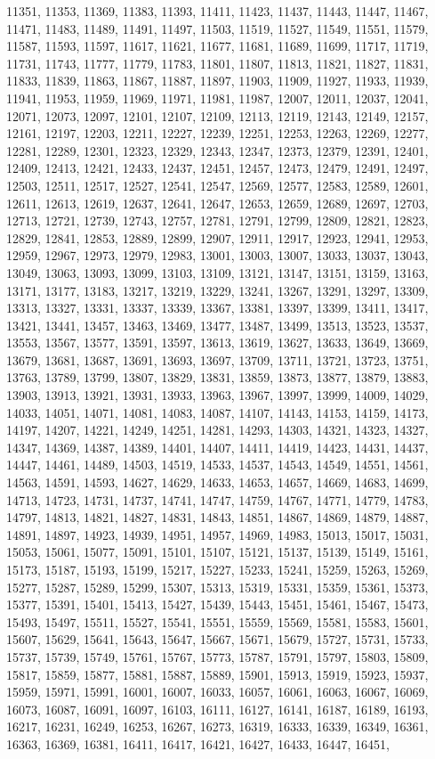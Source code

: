 \documentclass[10pt,twocolumn]{article}
\begin{document}
\begin{thebibliography}{9}
11351, 11353, 11369, 11383, 11393, 11411, 11423, 11437, 11443, 11447, 11467, 11471, 11483, 11489, 11491, 11497, 11503, 11519, 11527, 11549, 11551, 11579, 11587, 11593, 11597, 11617, 11621, 11677, 11681, 11689, 11699, 11717, 11719, 11731, 11743, 11777, 11779, 11783, 11801, 11807, 11813, 11821, 11827, 11831, 11833, 11839, 11863, 11867, 11887, 11897, 11903, 11909, 11927, 11933, 11939, 11941, 11953, 11959, 11969, 11971, 11981, 11987, 12007, 12011, 12037, 12041, 12071, 12073, 12097, 12101, 12107, 12109, 12113, 12119, 12143, 12149, 12157, 12161, 12197, 12203, 12211, 12227, 12239, 12251, 12253, 12263, 12269, 12277, 12281, 12289, 12301, 12323, 12329, 12343, 12347, 12373, 12379, 12391, 12401, 12409, 12413, 12421, 12433, 12437, 12451, 12457, 12473, 12479, 12491, 12497, 12503, 12511, 12517, 12527, 12541, 12547, 12569, 12577, 12583, 12589, 12601, 12611, 12613, 12619, 12637, 12641, 12647, 12653, 12659, 12689, 12697, 12703, 12713, 12721, 12739, 12743, 12757, 12781, 12791, 12799, 12809, 12821, 12823, 12829, 12841, 12853, 12889, 12899, 12907, 12911, 12917, 12923, 12941, 12953, 12959, 12967, 12973, 12979, 12983, 13001, 13003, 13007, 13033, 13037, 13043, 13049, 13063, 13093, 13099, 13103, 13109, 13121, 13147, 13151, 13159, 13163, 13171, 13177, 13183, 13217, 13219, 13229, 13241, 13267, 13291, 13297, 13309, 13313, 13327, 13331, 13337, 13339, 13367, 13381, 13397, 13399, 13411, 13417, 13421, 13441, 13457, 13463, 13469, 13477, 13487, 13499, 13513, 13523, 13537, 13553, 13567, 13577, 13591, 13597, 13613, 13619, 13627, 13633, 13649, 13669, 13679, 13681, 13687, 13691, 13693, 13697, 13709, 13711, 13721, 13723, 13751, 13763, 13789, 13799, 13807, 13829, 13831, 13859, 13873, 13877, 13879, 13883, 13903, 13913, 13921, 13931, 13933, 13963, 13967, 13997, 13999, 14009, 14029, 14033, 14051, 14071, 14081, 14083, 14087, 14107, 14143, 14153, 14159, 14173, 14197, 14207, 14221, 14249, 14251, 14281, 14293, 14303, 14321, 14323, 14327, 14347, 14369, 14387, 14389, 14401, 14407, 14411, 14419, 14423, 14431, 14437, 14447, 14461, 14489, 14503, 14519, 14533, 14537, 14543, 14549, 14551, 14561, 14563, 14591, 14593, 14627, 14629, 14633, 14653, 14657, 14669, 14683, 14699, 14713, 14723, 14731, 14737, 14741, 14747, 14759, 14767, 14771, 14779, 14783, 14797, 14813, 14821, 14827, 14831, 14843, 14851, 14867, 14869, 14879, 14887, 14891, 14897, 14923, 14939, 14951, 14957, 14969, 14983, 15013, 15017, 15031, 15053, 15061, 15077, 15091, 15101, 15107, 15121, 15137, 15139, 15149, 15161, 15173, 15187, 15193, 15199, 15217, 15227, 15233, 15241, 15259, 15263, 15269, 15277, 15287, 15289, 15299, 15307, 15313, 15319, 15331, 15359, 15361, 15373, 15377, 15391, 15401, 15413, 15427, 15439, 15443, 15451, 15461, 15467, 15473, 15493, 15497, 15511, 15527, 15541, 15551, 15559, 15569, 15581, 15583, 15601, 15607, 15629, 15641, 15643, 15647, 15667, 15671, 15679, 15727, 15731, 15733, 15737, 15739, 15749, 15761, 15767, 15773, 15787, 15791, 15797, 15803, 15809, 15817, 15859, 15877, 15881, 15887, 15889, 15901, 15913, 15919, 15923, 15937, 15959, 15971, 15991, 16001, 16007, 16033, 16057, 16061, 16063, 16067, 16069, 16073, 16087, 16091, 16097, 16103, 16111, 16127, 16141, 16187, 16189, 16193, 16217, 16231, 16249, 16253, 16267, 16273, 16319, 16333, 16339, 16349, 16361, 16363, 16369, 16381, 16411, 16417, 16421, 16427, 16433, 16447, 16451, 
\end{thebibliography}
\end{document}

